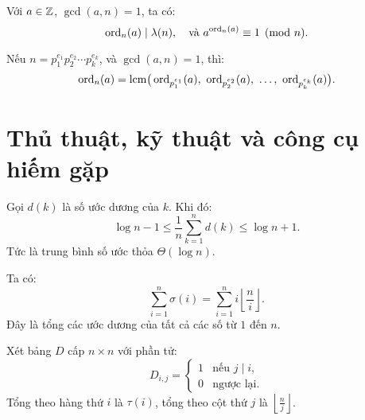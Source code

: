 \documentclass[../imo-training-open-book.tex]{subfiles}
\begin{document}
\begin{theorem}
    \label{theorem:order-modulo-composite}
    Với \( a \in \mathbb Z \), \( \gcd(a, n) = 1 \), ta có:
    \[
        \operatorname{ord}_n(a) \mid \lambda(n), \quad \text{và } a^{\operatorname{ord}_n(a)} \equiv 1 \pmod{n}.
    \]
\end{theorem}

\vspace{1em}

\begin{lemma}
    \label{lemma:order-lcm-crt}
    Nếu \( n = p_1^{e_1} p_2^{e_2} \cdots p_k^{e_k} \), và \( \gcd(a, n) = 1 \), thì:
    \[
        \ord_n(a) = \mathrm{lcm}\big(\ord_{p_1^{e_1}}(a),\ \ord_{p_2^{e_2}}(a),\ \dots,\ \ord_{p_k^{e_k}}(a)\big).
    \]
\end{lemma}

\newpage

\section{Thủ thuật, kỹ thuật và công cụ hiếm gặp}

\begin{theorem}
    \label{theorem:average-tau}
    Gọi \( d(k) \) là số ước dương của \( k \). Khi đó:
    \[
        \log n - 1 \le \frac{1}{n} \sum_{k=1}^n d(k) \le \log n + 1.
    \]
    Tức là trung bình số ước thỏa \( \Theta(\log n) \).
\end{theorem}

\vspace{1em}

\begin{theorem}
    \label{theorem:sum-of-divisors-table}
    Ta có:
    \[
        \sum_{i=1}^{n} \sigma(i) = \sum_{i=1}^{n} i \left\lfloor \frac{n}{i} \right\rfloor.
    \]
    Đây là tổng các ước dương của tất cả các số từ \( 1 \) đến \( n \).
\end{theorem}

\vspace{1em}

\begin{theorem}
    \label{theorem:divisor-matrix}
    Xét bảng \( D \) cấp \( n \times n \) với phần tử:
    \[
        D_{i,j} = 
        \begin{cases}
            1 & \text{nếu } j \mid i, \\
            0 & \text{ngược lại}.
        \end{cases}
    \]
    Tổng theo hàng thứ \( i \) là \( \tau(i) \), tổng theo cột thứ \( j \) là \( \left\lfloor \frac{n}{j} \right\rfloor \).
\end{theorem}
\end{document}
